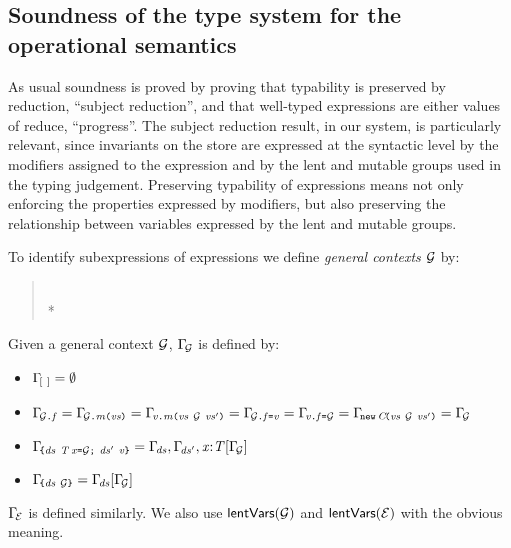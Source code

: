 {\subsection{Soundness of the type system for the operational semantics}

As usual soundness is proved by proving that typability is preserved by reduction, ``subject reduction'',  and  that well-typed expressions are either values of reduce, ``progress''. The subject reduction result, in our system, is particularly
relevant, since invariants on the store are expressed at the syntactic level by the modifiers assigned to the expression
and by the lent and mutable groups used in the typing judgement. 
Preserving typability of expressions means  not only enforcing the properties expressed by modifiers, but also
preserving the relationship between variables expressed by the lent and mutable groups. 

To identify  subexpressions of expressions we define {\em general contexts} ${\cal{G}}$ by:
\begin{quote}
\begin{grammatica}
\\*
\end{grammatica}
\end{quote}

Given a general context ${\cal{G}}$, $\Gamma_{\!{\cal{G}}}$ is defined by: 
\begin{itemize}
 \item $\Gamma_{\![\ ]}=\emptyset$
 \item $\TypeEnv{\FieldAccess{\genCtx}{\f}}=\TypeEnv{\MethCall{\genCtx}{\m}{\vs}}=\TypeEnv{\MethCall{\val}{\m}{\vs\ \genCtx\ \vs'}}=\TypeEnv{\FieldAssign{\genCtx}{\f}{\val}}=\TypeEnv{\FieldAssign{\val}{\f}{\genCtx}}=\TypeEnv{\ConstrCall{\C}{\vs\ \genCtx\ \vs'}}=\TypeEnv{\genCtx}$
  \item $\TypeEnv{\Block{\decs\ \Dec{\T}{\x}{\genCtx}\ \decs'}{\val}}=\TypeEnv{\decs},\TypeEnv{\decs'},\TypeDec{\T}{\x} [\TypeEnv{\genCtx}]$
  \item $\Gamma_{\!\texttt{\{}\mathit{ds}\ {\cal{G}}\texttt{\}}}=\Gamma_{\!\mathit{ds}}[\Gamma_{\!{\cal{G}}}]$
 \end{itemize}
$\Gamma_{\!{\cal{E}}}$ is defined similarly.  We also use $\textsf{lentVars}({\cal{G}})$ and $\textsf{lentVars}({\cal{E}})$ with the obvious meaning.

}
